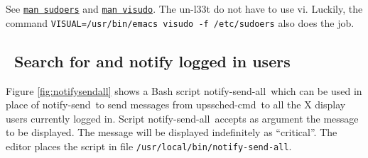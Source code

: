 \documentclass[12pt]{article}
\newlength{\headersep}\setlength{\headersep}{3mm}
\newcommand{\Hsep}{\hspace{\headersep}}
\newcommand{\newcolumn}{\vfill\eject}
\newcommand{\upsschedcmd}{\mbox{\textcolor{CMDCOLOUR}{upssched-cmd}}}
\newcommand{\notifysend}{\mbox{\textcolor{NOTIFYCOLOUR}{notify-send}}}
\newcommand{\notifysendall}{\mbox{\textcolor{NOTIFYCOLOUR}{notify-send-all}}}
\begin{document}
See \href{https://www.sudo.ws/man/1.8.13/sudoers.man.html}{\texttt{man
    sudoers}} and
\href{https://www.sudo.ws/man/1.8.13/visudo.man.html}{\texttt{man visudo}}.
The un-l33t do not have to use vi.  Luckily, the command
\texttt{VISUAL=/usr/{\allowbreak}bin/{\allowbreak}emacs visudo -f
  /etc/sudoers} also does the job.


\vspace*{\fill}

\begin{center}
\end{center}

\vspace*{\fill}

\newcolumn
\subsection{\Hsep\ Search for and notify logged in users}\label{section:notifysend.user}

Figure \ref{fig:notifysendall} shows a Bash script \notifysendall\ which can
be used in place of \notifysend\ to send messages from \upsschedcmd\ to all
the X display users currently logged in.  Script \notifysendall\ accepts as
argument the message to be displayed.  The message will be displayed
indefinitely as ``critical''.  The editor places the script in file
\texttt{/usr/local/bin/{\allowbreak}notify-send-all}.
\end{document}
